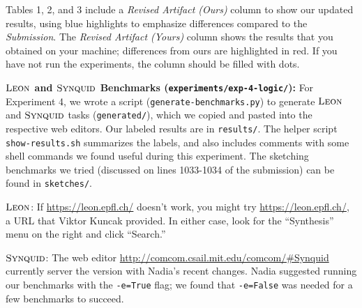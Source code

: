 \documentclass[acmsmall,nonacm]{acmart}
\newcommand{\leon}
  {\ensuremath{\textsc{Leon}}}
\newcommand{\synquid}
  {\ensuremath{\textsc{Synquid}}}
\begin{document}
Tables 1, 2, and 3 include a \textit{Revised Artifact (Ours)} column to show our
updated results, using blue highlights to emphasize differences compared to the
\textit{Submission}.
%
The \textit{Revised Artifact (Yours)} column shows the results that you obtained
on your machine; differences from ours are highlighted in red.
%
If you have not run the experiments, the column should be filled with dots.


\vspace{0.30in}
%
\noindent
%
\textbf{\leon{} and \synquid{} Benchmarks (\texttt{experiments/exp-4-logic/}):}
%
For Experiment 4, we wrote a script
%
(\texttt{generate-benchmarks.py})
%
to generate \leon{} and \synquid{} tasks
%
(\texttt{generated/}),
%
which we copied and pasted into the respective web editors.
%
Our labeled results are in \texttt{results/}.
%
The helper script \texttt{show-results.sh} summarizes the labels,
and also includes comments with some shell commands we found useful during
this experiment.
%
The sketching benchmarks we tried (discussed on lines 1033-1034 of the
submission) can be found in \texttt{sketches/}.

\leon{}: If \url{https://leon.epfl.ch/} doesn't work, you might try
\url{https://leon.epfl.ch/}, a URL that Viktor Kuncak provided. In either case,
look for the ``Synthesis'' menu on the right and click ``Search.''

\synquid{}: The web editor \url{http://comcom.csail.mit.edu/comcom/#Synquid}
currently server the version with Nadia's recent changes. Nadia suggested
running our benchmarks with the \texttt{-e=True} flag; we found that
\texttt{-e=False} was needed for a few benchmarks to succeed.

\clearpage

\setcounter{figure}{9}

\setcounter{figure}{0}





\end{document}
